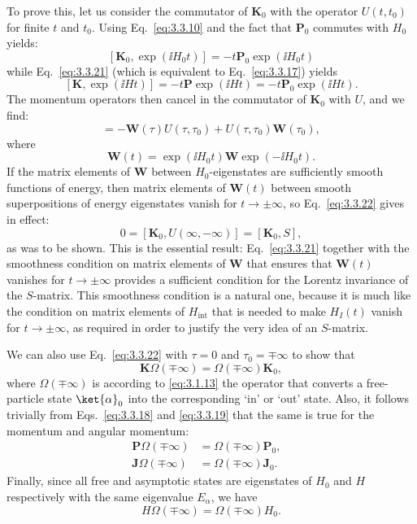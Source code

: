 To prove this, let us consider the commutator of $\mathbf{K}_0$ with the operator
$U(t,t_0)$ for finite $t$ and $t_0$. Using Eq.~\eqref{eq:3.3.10} and the fact that
$\mathbf{P}_0$ commutes with $H_0$ yields:
\[
[\mathbf{K}_0,\exp(\ii H_0t)]=-t\mathbf{P}_0\exp(\ii H_0t)
\]
while Eq.~\eqref{eq:3.3.21} (which is equivalent to Eq.~\eqref{eq:3.3.17}) yields
\[
[\mathbf{K},\exp(\ii Ht)]=-t\mathbf{P}\exp(\ii Ht)
=-t\mathbf{P}_0\exp(\ii Ht).
\]
The momentum operators then cancel in the commutator of $\mathbf{K}_0$ with $U$,
and we find:
\begin{equation}
[\mathbf{K}_0,U(\tau,\tau_0)]
=-\mathbf{W}(\tau)U(\tau,\tau_0)+U(\tau,\tau_0)\mathbf{W}(\tau_0),
\tag{3.3.22}\label{eq:3.3.22}
\end{equation}
where
\begin{equation}
\mathbf{W}(t)=\exp(\ii H_0t)\mathbf{W}\exp(-\ii H_0t).
\tag{3.3.23}\label{eq:3.3.23}
\end{equation}
If the matrix elements of $\mathbf{W}$ between $H_0$-eigenstates are sufficiently
smooth functions of energy, then matrix elements of $\mathbf{W}(t)$ between smooth
superpositions of energy eigenstates vanish for $t\to\pm\infty$, so Eq.~\eqref{eq:3.3.22}
gives in effect:
\begin{equation}
0=[\mathbf{K}_0,U(\infty,-\infty)]=[\mathbf{K}_0,S],
\tag{3.3.24}\label{eq:3.3.24}
\end{equation}
as was to be shown. This is the essential result: Eq.~\eqref{eq:3.3.21} together with the
smoothness condition on matrix elements of $\mathbf{W}$ that ensures that
$\mathbf{W}(t)$ vanishes for $t\to\pm\infty$ provides a sufficient condition for
the Lorentz invariance of the $S$-matrix. This smoothness condition is a natural
one, because it is much like the condition on matrix elements of $H_{\mathrm{int}}$
that is needed to make $H_I(t)$ vanish for $t\to\pm\infty$, as required in order
to justify the very idea of an $S$-matrix.

We can also use Eq.~\eqref{eq:3.3.22} with $\tau=0$ and $\tau_0=\mp\infty$ to show that
\begin{equation}
\mathbf{K}\Omega(\mp\infty)=\Omega(\mp\infty)\mathbf{K}_0,
\tag{3.3.25}\label{eq:3.3.25}
\end{equation}
where $\Omega(\mp\infty)$ is according to \eqref{eq:3.1.13} the operator that converts a
free-particle state $\ket{\alpha}_0$ into the corresponding `in' or `out' state.
Also, it follows trivially from Eqs.~\eqref{eq:3.3.18} and \eqref{eq:3.3.19} that the same is true
for the momentum and angular momentum:
\begin{align}
\mathbf{P}\Omega(\mp\infty)&=\Omega(\mp\infty)\mathbf{P}_0,
&\tag{3.3.26}\label{eq:3.3.26}\\
\mathbf{J}\Omega(\mp\infty)&=\Omega(\mp\infty)\mathbf{J}_0.
&\tag{3.3.27}\label{eq:3.3.27}
\end{align}
Finally, since all free and asymptotic states are eigenstates of $H_0$ and $H$
respectively with the same eigenvalue $E_\alpha$, we have
\begin{equation}
H\Omega(\mp\infty)=\Omega(\mp\infty)H_0.
\tag{3.3.28}\label{eq:3.3.28}
\end{equation}

